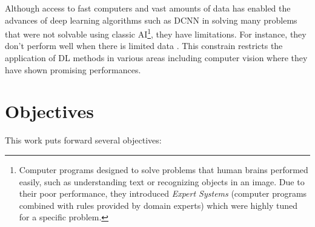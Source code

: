 Although access to fast computers and vast amounts of data has enabled the advances of deep learning algorithms such as DCNN in solving many problems that were not solvable using classic AI\footnote{Computer programs designed to solve problems that human brains performed easily, such as understanding text or recognizing objects in an image. Due to their poor performance, they introduced \textit{Expert Systems} (computer programs combined with rules provided by domain experts) which were highly tuned for a specific problem. }, they have limitations. For instance, they don't perform well when there is limited data \cite{griffin2007caltech}. This constrain restricts the application of DL methods in various areas including computer vision where they have shown promising performances.  


\section{Objectives}
This work puts forward several objectives:
